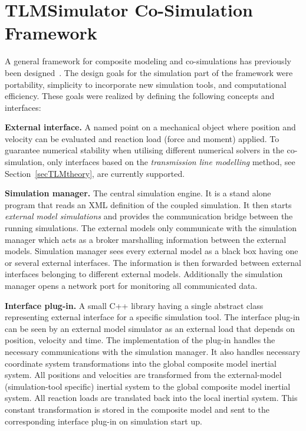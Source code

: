 \chapter{TLMSimulator Co-Simulation \\Framework}
\label{framework}
A general framework for composite modeling and co-simulations has previously been designed~\cite{Siemers+Nakhimovski+Fritzson-05}. 
The design goals for the simulation part of the framework were portability, simplicity to incorporate new simulation tools, and computational efficiency.
These goals were realized by defining the following concepts and interfaces:

\textbf{External interface.} 
A named point on a mechanical object where position and velocity can be evaluated and reaction load (force and moment) applied. 
To guarantee numerical stability when utilising different numerical solvers in the co-simulation, only interfaces based on the {\em transmission line modelling} method, see Section~\ref{secTLMtheory}, are currently supported.

\textbf{Simulation manager.} 
The central simulation engine. 
It is a stand alone program that reads an XML definition of the coupled simulation.  
It then starts \emph{external model simulations} and provides the communication bridge between the running simulations. 
The external models only communicate with the simulation manager which acts as a broker marshalling information between the external models. 
Simulation manager sees every external model as a black box having one or several external interfaces. 
The information is then forwarded between external interfaces belonging to different external models. 
Additionally the simulation manager opens a network port for monitoring all communicated data.

\textbf{Interface plug-in.} 
A small C++ library having a single abstract class representing external interface for a specific simulation tool. 
The interface plug-in can be seen by an external model simulator as an external load that depends on position, velocity
and time. 
The implementation of the plug-in handles the necessary communications with the simulation manager. 
It also handles necessary coordinate system transformations into the global composite model inertial system. 
All positions and velocities are transformed from the external-model (simulation-tool specific) inertial system to the
global composite model inertial system. 
All reaction loads are translated back into the local inertial system. 
This constant transformation is stored in the composite model and sent to the corresponding interface plug-in on simulation start up.


